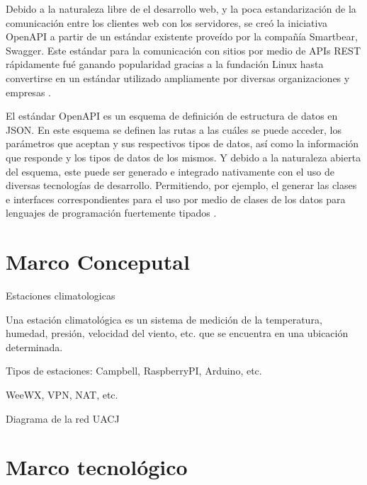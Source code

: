 
Debido a la naturaleza libre de el desarrollo web, y la poca estandarización de la comunicación entre los clientes web con los servidores, se creó la iniciativa OpenAPI a partir de un estándar existente proveído por la compañía Smartbear, Swagger. Este estándar para la comunicación con sitios por medio de APIs REST rápidamente fué ganando popularidad gracias a la fundación Linux hasta convertirse en un estándar utilizado ampliamente por diversas organizaciones y empresas \cite{OpenAPI_foundation}.

El estándar OpenAPI es un esquema de definición de estructura de datos en JSON. En este esquema se definen las rutas a las cuáles se puede acceder, los parámetros que aceptan y sus respectivos tipos de datos, así como la información que responde y los tipos de datos de los mismos. Y debido a la naturaleza abierta del esquema, este puede ser generado e integrado nativamente con el uso de diversas tecnologías de desarrollo. Permitiendo, por ejemplo, el generar las clases e interfaces correspondientes para el uso por medio de clases de los datos para lenguajes de programación fuertemente tipados \cite{openapi_generator}.


\section{Marco Conceputal}

Estaciones climatologicas

Una estación climatológica es un sistema de medición de la temperatura, humedad, presión, velocidad del viento, etc. que se encuentra en una ubicación determinada.

Tipos de estaciones: Campbell, RaspberryPI, Arduino, etc.

WeeWX, VPN, NAT, etc.

Diagrama de la red UACJ

\section{Marco tecnológico}



